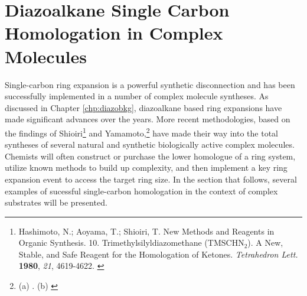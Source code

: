  \section{Diazoalkane Single Carbon Homologation in Complex
Molecules}
Single-carbon ring expansion is a powerful synthetic disconnection and has been
successfully implemented in a number of complex molecule syntheses. As discussed in Chapter
\ref{chp:diazobkg}, diazoalkane based ring expansions have made significant advances over the years.
More recent methodologies, based on the findings of Shioiri\footnote{{\frenchspacing Hashimoto, N.;
Aoyama, T.; Shioiri, T. New Methods and Reagents in Organic Synthesis. 10.
Trimethylsilyldiazomethane (TMSCHN$_2$). A New, Stable, and Safe Reagent for the Homologation of
Ketones. \textit{Tetrahedron Lett.} \textbf{1980}, \textit{21}, 4619-4622.} \label{ref:cshioiri}}
and Yamamoto,\footnote{(a)
. (b)  \label{ref:cyamamoto}} have made their way into
the total syntheses of several natural and synthetic biologically active complex molecules. Chemists will often construct or purchase
the lower homologue of a ring system, utilize known methods to build up
complexity, and then implement a key ring expansion event to access the target ring size. In the
section that follows, several examples of sucessful single-carbon homologation
in the context of complex substrates will be presented. 

